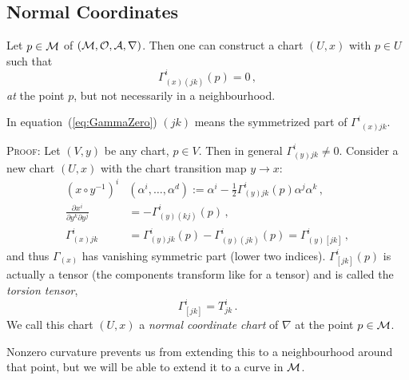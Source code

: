 \documentclass[11pt, a4paper, twocolumn]{article} %
\begin{document}
\subsection{Normal Coordinates}
Let $p\in \mathcal{M}$ of $(\mathcal{M}, \mathcal{O}, \mathcal{A}, \nabla)$.
Then one can construct a chart $(U,x)$ with $p\in U$ such that
\begin{equation}
    \Gamma^i_{(x)(jk)}(p) = 0\,,
    \label{eq:GammaZero}
\end{equation}
\textit{at} the point $p$, but not necessarily in a neighbourhood.
\begin{note}
    In equation~(\ref{eq:GammaZero}) $(jk)$ means the symmetrized part of $\Gamma^i{}_{(x)jk}$.
\end{note}

\textsc{Proof}: Let $(V,y)$ be any chart, $p\in V$.
Then in general $\Gamma^i_{(y)jk}\neq 0$.
Consider a new chart $(U,x)$ with the chart transition map $y \to x$:
\begin{align*}
    (x\circ y^{-1})^i&(\alpha^i, \ldots, \alpha^d) := \alpha^i - \frac{1}{2} \Gamma^i_{(y)jk}(p) \alpha^j \alpha^k\,,\\
    \frac{\partial x^i}{\partial y^k \partial y^j} &= - \Gamma^i_{(y)(kj)}(p)\,,\\
    \Gamma^i_{(x)jk} &= \Gamma^i_{(y)jk}(p) - \Gamma^i_{(y)(jk)}(p) = \Gamma^i_{(y)[jk]}\,,
\end{align*}
and thus $\Gamma_{(x)}$ has vanishing symmetric part (lower two indices).
$\Gamma^i_{[jk]}(p)$ is actually a tensor (the components transform like for a tensor) and is called the
\textit{torsion tensor},
\begin{equation}
    \Gamma^i_{[jk]} = T^{i}_{jk}\,.
\end{equation}
We call this chart $(U,x)$ a \textit{normal coordinate chart} of $\nabla$ at the point $p\in\mathcal{M}$.
\begin{note}
    Nonzero curvature prevents us from extending this to a neighbourhood
    around that point, but we will be able to extend it to a curve in $\mathcal{M}$.
\end{note}
\end{document}
